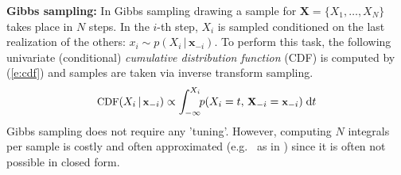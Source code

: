 \documentclass[]{article}
\newcommand{\bvec}[1]{\textbf{#1}}
\newcommand{\pr}{p}
\newcommand{\dd}{\;\mathrm{d}} %
\begin{document}
{\bf Gibbs sampling:}
 In Gibbs  sampling \citep{geman1984stochastic} drawing a sample for $\bvec{X} = \{X_1, \ldots, X_N\}$ takes place in $N$ steps.
In the $i$-th step, $X_i$ is sampled conditioned on the last realization of the others:
$x_i \sim \pr(X_i \,|\, \bvec{x}_{-i})$. 
To perform this task, the following univariate (conditional) \emph{cumulative distribution function} (CDF)
is computed by (\ref{e:cdf}) and samples are taken via inverse transform sampling. 
\begin{equation} \footnotesize
\label{e:cdf}
\text{CDF}(X_i  \,|\, \bvec{x}_{-i}) 
\propto
\int_{-\infty}^{X_i} \!\! \pr(X_i = t, \,\bvec{X}_{-i} = \bvec{x}_{-i})  \dd  t
\end{equation} 
Gibbs sampling does not require any 'tuning'. 
However, computing $N$ integrals per sample is costly and often approximated 
(e.g.\ %
as in \citep{gilks1992adaptive})
since it is often not possible in closed form.  
 



\end{document}
